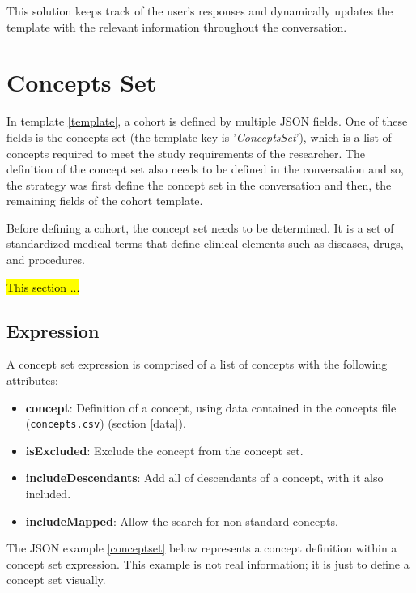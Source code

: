 This solution keeps track of the user's responses and dynamically updates the template with the relevant information throughout the conversation.


\section{Concepts Set}


In template \ref{template}, a cohort is defined by multiple JSON fields. One of these fields is the concepts set (the template key is '\textit{ConceptsSet}'), which is a list of concepts required to meet the study requirements of the researcher. The definition of the concept set also needs to be defined in the conversation and so, the strategy was first define the concept set in the conversation and then, the remaining fields of the cohort template.

Before defining a cohort, the concept set needs to be determined. It is a set of standardized medical terms that define clinical elements such as diseases, drugs, and procedures.

\hl{This section ...}


\subsection{Expression}
A concept set expression is comprised of a list of concepts with the following attributes:

\begin{itemize}
  \item \textbf{concept}: Definition of a concept, using data contained in the concepts file  {\small\normalfont(\texttt{concepts.csv})} (section \ref{data}).
  \item \textbf{isExcluded}: Exclude the concept from the concept set.
  \item \textbf{includeDescendants}: Add all of descendants of a concept, with it also included.
  \item \textbf{includeMapped}: Allow the search for non-standard concepts.
\end{itemize}


The JSON example \ref{conceptset} below represents a concept definition within a concept set expression. This example is not real information; it is just to define a concept set visually.

